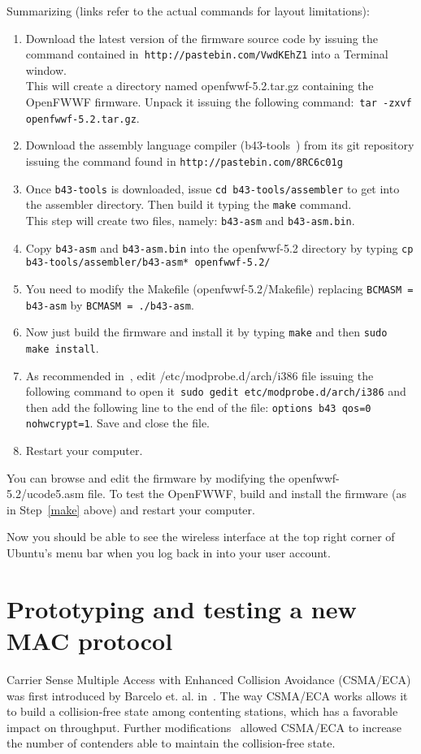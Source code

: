 \documentclass[conference]{IEEEtran}
\begin{document}
Summarizing (links refer to the actual commands for layout limitations):
\begin{enumerate}
	\item Download the latest version of the firmware source code by issuing the command contained in~\texttt{http://pastebin.com/VwdKEhZ1} into a Terminal window. \\ This will create a directory named  openfwwf-5.2.tar.gz containing the OpenFWWF firmware. Unpack it issuing the following command:~\texttt{tar -zxvf openfwwf-5.2.tar.gz}.
	\item Download the assembly language compiler (b43-tools~\cite{b43-tools}) from its git repository issuing the command found in \texttt{http://pastebin.com/8RC6c01g}
	\item Once \texttt{b43-tools} is downloaded, issue \texttt{cd b43-tools/assembler} to get into the assembler directory. Then build it typing the \texttt{make} command.\\ This step will create two files, namely: \texttt{b43-asm} and \texttt{b43-asm.bin}.
	\item Copy \texttt{b43-asm} and \texttt{b43-asm.bin} into the openfwwf-5.2 directory by typing \texttt{cp b43-tools/assembler/b43-asm* openfwwf-5.2/}
	\item You need to modify the Makefile (openfwwf-5.2/Makefile) replacing \texttt{BCMASM = b43-asm} by \texttt{BCMASM = ./b43-asm}.
	\item Now just build the firmware and install it by typing \texttt{make} and then \texttt{sudo make install}.\label{make}
	\item As recommended in~\cite{OpenFWWF}, edit /etc/modprobe.d/arch/i386 file issuing the following command to open it~\texttt{sudo gedit etc/modprobe.d/arch/i386} and then add the following line to the end of the file: \texttt{options b43 qos=0 nohwcrypt=1}. Save and close the file.
	\item Restart your computer.
\end{enumerate}

You can browse and edit the firmware by modifying the openfwwf-5.2/ucode5.asm file. To test the OpenFWWF, build and install the firmware (as in Step~\ref{make} above) and restart your computer.

Now you should be able to see the wireless interface at the top right corner of Ubuntu's menu bar when you log back in into your user account.

\section{Prototyping and testing a new MAC protocol}
Carrier Sense Multiple Access with Enhanced Collision Avoidance (CSMA/ECA) was first introduced by Barcelo et. al. in~\cite{barcelo2008lba}. The way CSMA/ECA works allows it to build a collision-free state among contenting stations, which has a favorable impact on throughput. Further modifications~\cite{research2standards} allowed CSMA/ECA to increase the number of contenders able to maintain the collision-free state.
\end{document}
